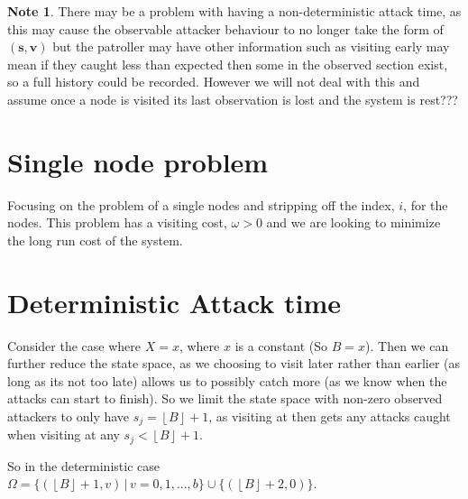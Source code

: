 \documentclass[a4paper,10pt]{article}
\newcommand{\floor}[1]{\left \lfloor #1 \right \rfloor}
\theoremstyle{definition}
\theoremstyle{definition}
\theoremstyle{remark}
\theoremstyle{definition}
\newtheorem*{note}{Note}
\begin{document}
\begin{note}
There may be a problem with having a non-deterministic attack time, as this may cause the observable attacker behaviour to no longer take the form of $(\bm{s},\bm{v})$ but the patroller may have other information such as visiting early may mean if they caught less than expected then some in the observed section exist, so a full history could be recorded. However we will not deal with this and assume once a node is visited its last observation is lost and the system is rest???
\end{note}

\section{Single node problem}
Focusing on the problem of a single nodes and stripping off the index, $i$, for the nodes. This problem has a visiting cost, $\omega>0$ and we are looking to minimize the long run cost of the system.

\section{Deterministic Attack time}
Consider the case where $X=x$, where $x$ is a constant (So $B=x$). Then we can further reduce the state space, as we choosing to visit later rather than earlier (as long as its not too late) allows us to possibly catch more (as we know when the attacks can start to finish). So we limit the state space with non-zero observed attackers to only have $s_{j}=\floor{B}+1$, as visiting at then gets any attacks caught when visiting at any $s_{j} < \floor{B}+1$.

So in the deterministic case $\Omega= \{(\floor{B}+1,v) \, | \, v=0,1,...,b \} \cup \{(\floor{B}+2,0) \}$.
\end{document}
